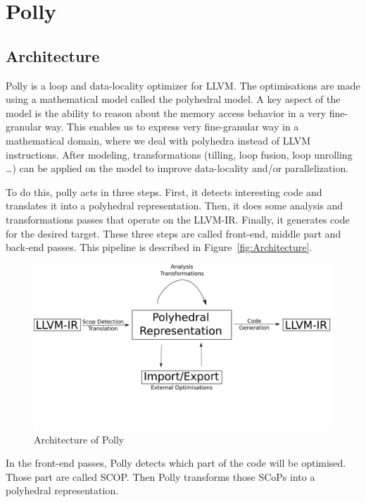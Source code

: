 \chapter{Polly}\label{ch:Polly}

\section{Architecture}
Polly is a loop and data-locality optimizer for LLVM\cite{Polly}. The optimisations are made using a mathematical model called the polyhedral model. A key aspect of the model is the ability to reason about the memory access behavior in a very fine-granular way. This enables us to express very fine-granular way in a mathematical domain, where we deal with polyhedra instead of LLVM instructions. After modeling, transformations (tilling, loop fusion, loop unrolling …) can be applied on the model to improve data-locality and/or parallelization.

To do this, polly acts in three steps. First, it detects interesting code and translates it into a polyhedral representation. Then, it does some analysis and transformations passes that operate on the LLVM-IR. Finally, it generates code for the desired target. These three steps are called front-end, middle part and back-end passes. This pipeline is described in Figure~\ref{fig:Architecture}.

\begin{figure}
\centering
\includegraphics[scale=0.4]{gfx/Polly/Architecture.png}
\caption{Architecture of Polly}
\label{fig:PollyArchitecture}
\end{figure}

In the front-end passes, Polly detects which part of the code will be optimised. Those part are called \ac{SCOP}. Then Polly transforms those SCoPs into a polyhedral representation. 

